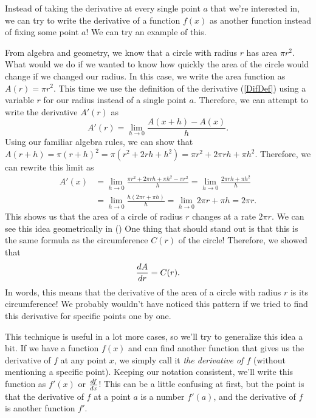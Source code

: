
Instead of taking the derivative at every single point $a$ that we're interested in, we can try to write the derivative of a function $f(x)$ as another function instead of fixing some point $a$! We can try an example of this.

\begin{exmp}
  From algebra and geometry, we know that a circle with radius $r$ has area $\pi r^2$. What would we do if we wanted to know how quickly the area of the circle would change if we changed our radius. In this case, we write the area function as $A(r) =  \pi r^2$. This time we use the definition of the derivative (\cref{DifDef}) using a variable $r$ for our radius instead of a single point $a$. Therefore, we can attempt to write the derivative $A'(r)$ as
  \[
  A'(r) = \lim\limits_{h\to 0}\frac{A(x+h)-A(x)}{h}.
  \]
  Using our familiar algebra rules, we can show that $A(r+h) = \pi(r+h)^2 = \pi(r^2 + 2rh + h^2) = \pi r^2 + 2\pi rh + \pi h^2$. Therefore, we can rewrite this limit as
  \begin{align}
  A'(x) & = \lim\limits_{h\to 0}\frac{\pi r^2 + 2\pi rh + \pi h^2 - \pi r^2}{h} =  \lim\limits_{h\to 0}\frac{2\pi rh + \pi h^2}{h}\\
  & = \lim\limits_{h\to 0}\frac{h(2\pi r + \pi h)}{h} = \lim\limits_{h\to 0} 2\pi r + \pi h = 2\pi r.
  \end{align} This shows us that the area of a circle of radius $r$ changes at a rate $2\pi r$. We can see this idea geometrically in ()  One thing that should stand out is that this is the same formula as the circumference $C(r)$ of the circle! Therefore, we showed that
  \[
  \frac{d A}{d r} = C(r).
  \]  In words, this means that the derivative of the area of a circle with radius $r$ is its circumference! We probably wouldn't have noticed this pattern if we tried to find this derivative for specific points one by one.
\end{exmp}



This technique is useful in a lot more cases, so we'll try to generalize this idea a bit. If we have a function $f(x)$ and can find another function that gives us the derivative of $f$ at any point $x$, we simply call it \emph{the derivative of $f$} (without mentioning a specific point). Keeping our notation consistent, we'll write this function as $f'(x)$ or $\frac{d f}{d x}$! This can be a little confusing at first, but the point is that the derivative of $f$ at a point $a$ is a number $f'(a)$, and the derivative of $f$ is another function $f'$.\\

